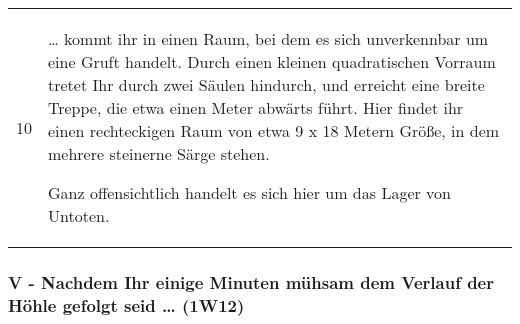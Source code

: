 \begin{tabularx}{\columnwidth}{cZ}
10 & 
  \ldots{} kommt ihr in einen Raum, bei dem es sich unverkennbar um eine
  Gruft handelt. Durch einen kleinen quadratischen Vorraum tretet Ihr
  durch zwei Säulen hindurch, und erreicht eine breite Treppe, die etwa
  einen Meter abwärts führt. Hier findet ihr einen rechteckigen Raum von
  etwa 9 x 18 Metern Größe, in dem mehrere steinerne Särge stehen.

  Ganz offensichtlich handelt es sich hier um das Lager von Untoten.
\end{tabularx}

\subsubsection{V - Nachdem Ihr einige Minuten mühsam dem Verlauf der Höhle
gefolgt seid \ldots{} (1W12)}

